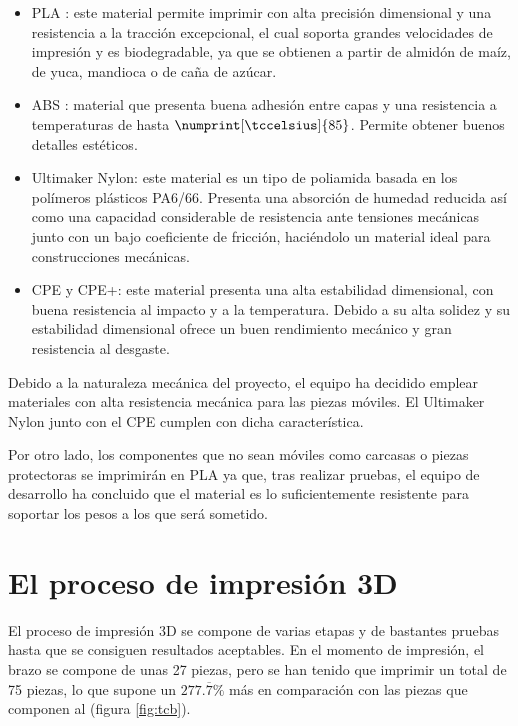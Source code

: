 \begin{itemize}
    \item \ac{PLA} \cite{AcidoPolilactico2020}: este material permite imprimir 
    con alta precisión dimensional y una resistencia a la tracción excepcional, 
    el cual soporta grandes velocidades de impresión y es biodegradable, ya que
    se obtienen a partir de almidón de maíz, de yuca, mandioca o de caña de azúcar. 
    \item \ac{ABS} \cite{AcrilonitriloButadienoEstireno2020}: material que presenta 
    buena adhesión entre capas y una resistencia a temperaturas de hasta 
    $\numprint[\tccelsius]{85}$. Permite obtener buenos detalles estéticos.
    \item Ultimaker Nylon: este material es un tipo de poliamida basada en los 
    polímeros plásticos PA6/66. Presenta una absorción de humedad reducida así como 
    una capacidad considerable de resistencia ante tensiones mecánicas junto con un 
    bajo coeficiente de fricción, haciéndolo un material ideal para construcciones 
    mecánicas.
    \item CPE y CPE+: este material presenta una alta estabilidad dimensional, con 
    buena resistencia al impacto y a la temperatura. Debido a su alta solidez y su 
    estabilidad dimensional ofrece un buen rendimiento mecánico y gran resistencia 
    al desgaste.
\end{itemize}

Debido a la naturaleza mecánica del proyecto, el equipo ha decidido emplear 
materiales con alta resistencia mecánica para las piezas móviles. 
El Ultimaker Nylon junto con el CPE cumplen con dicha característica.

Por otro lado, los componentes que no sean móviles como carcasas o  
piezas protectoras se imprimirán en PLA ya que, tras realizar pruebas, el equipo 
de desarrollo ha concluido que el material es lo suficientemente resistente para 
soportar los pesos a los que será sometido.

\section{El proceso de impresión 3D}
El proceso de impresión 3D se compone de varias etapas y de bastantes pruebas hasta
que se consiguen resultados aceptables. En el momento de impresión, el brazo se
compone de unas 27 piezas, pero se han tenido que imprimir un total de 75 piezas,
lo que supone un $277.\overline{7}\%$ más en comparación con las piezas que componen
al \pArm{} (figura \ref{fig:tcb}).

